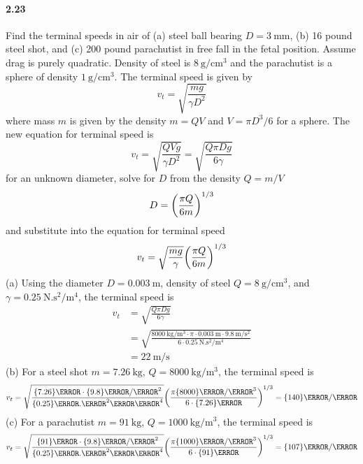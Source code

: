 \documentclass[../problems.tex]{subfiles}
\begin{document}
\paragraph{2.23} Find the terminal speeds in air of (a) steel ball bearing $D = \qty{3}{\mm}$, (b)
16 pound steel shot, and (c) 200 pound parachutist in free fall in the fetal position. Assume drag
is purely quadratic. Density of steel is $\qty{8}{\g\per\cm^3}$ and the parachutist is a sphere of
density $\qty{1}{\g\per\cm^3}$.
\barh 
The terminal speed is given by
\begin{equation*}
    v_t = \sqrt{\frac{mg}{\gamma D^2}}
\end{equation*}
where mass $m$ is given by the density $m = QV$ and $V = \pi D^3/6$ for a sphere. The new equation
for terminal speed is
\begin{equation*}
    v_t = \sqrt{\frac{QVg}{\gamma D^2}} = \sqrt{\frac{Q\pi D g}{6\gamma}}
\end{equation*}
for an unknown diameter, solve for $D$ from the density $Q = m/V$
\begin{equation*}
    D = \quantity(\frac{\pi Q}{6m})^{1/3}
\end{equation*}
and substitute into the equation for terminal speed
\begin{equation*}
    v_t = \sqrt{\frac{m g}{\gamma}} \quantity(\frac{\pi Q}{6m})^{1/3}
\end{equation*}
(a) Using the diameter $D = \qty{0.003}{\m}$, density of steel $Q = \qty{8}{\g\per\cm^3}$, and
$\gamma = \qty{0.25}{\N.\s^2\per\m^4}$, the terminal speed is
\begin{align*}
    v_t &= \sqrt{\frac{Q\pi D g}{6\gamma}} \\
    &= \sqrt{\frac{\qty{8000}{\kg\per\m^3} \cdot \pi \cdot \qty{0.003}{\m} \cdot 
        \qty{9.8}{\m\per\s^2}}{6\cdot\qty{0.25}{\N.\s^2\per\m^4}}} \\
    &= \qty{22}{\m/\s} 
\end{align*}
(b) For a steel shot $m = \qty{7.26}{\kg}$, $Q = \qty{8000}{\kg\per\m^3}$, the terminal speed is
\begin{equation*}
    v_t = \sqrt{\frac{\qty{7.26}{\kg}\cdot\qty{9.8}{\m/\s^2}}{\qty{0.25}{\N.\s^2\per\m^4}}}
        \quantity(\frac{\pi\qty{8000}{\kg/\m^3}}{6\cdot\qty{7.26}{\kg}})^{1/3} = \qty{140}{\m/\s}
\end{equation*}
(c) For a parachutist $m = \qty{91}{\kg}$, $Q = \qty{1000}{\kg\per\m^3}$, the terminal speed is
\begin{equation*}
    v_t = \sqrt{\frac{\qty{91}{\kg}\cdot\qty{9.8}{\m/\s^2}}{\qty{0.25}{\N.\s^2\per\m^4}}}
        \quantity(\frac{\pi\qty{1000}{\kg/\m^3}}{6\cdot\qty{91}{\kg}})^{1/3} = \qty{107}{\m/\s}
\end{equation*}
\end{document}
